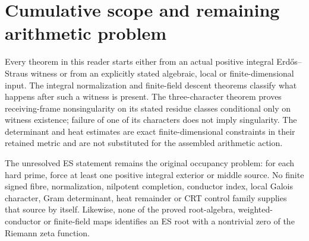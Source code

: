 \documentclass[11pt]{article}
\newcounter{none}
\theoremstyle{definition}\newtheorem{definition}[theorem]{Definition}
\theoremstyle{remark}\newtheorem{remark}[theorem]{Remark}
\begin{document}


\clearpage
\section{Cumulative scope and remaining arithmetic problem}

Every theorem in this reader starts either from an actual positive integral
Erd\H{o}s--Straus witness or from an explicitly stated algebraic, local or
finite-dimensional input.  The integral normalization and finite-field
descent theorems classify what happens after such a witness is present.  The
three-character theorem proves receiving-frame nonsingularity on its stated
residue classes conditional only on witness existence; failure of one of its
characters does not imply singularity.  The determinant and heat estimates
are exact finite-dimensional constraints in their retained metric and are not
substituted for the assembled arithmetic action.

The unresolved ES statement remains the original occupancy problem: for each
hard prime, force at least one positive integral exterior or middle source.
No finite signed fibre, normalization, nilpotent completion, conductor index,
local Galois character, Gram determinant, heat remainder or CRT control family
supplies that source by itself.  Likewise, none of the proved root-algebra,
weighted-conductor or finite-field maps identifies an ES root with a
nontrivial zero of the Riemann zeta function.
\end{document}
